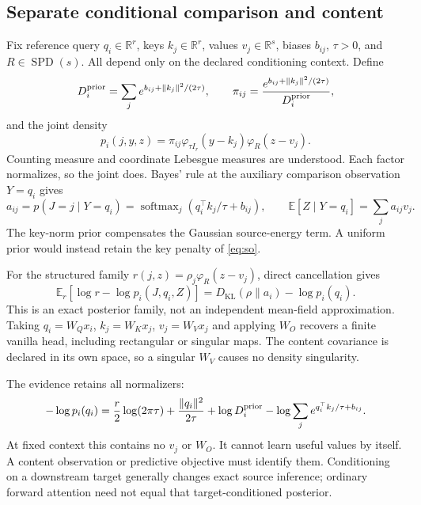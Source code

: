 \documentclass[11pt,letterpaper]{article}
\newcommand{\R}{\mathbb R}
\newcommand{\KL}{D_{\mathrm{KL}}}
\newcommand{\SPD}{\operatorname{SPD}}
\newcommand{\softmax}{\operatorname{softmax}}
\newcommand{\E}{\mathbb E}
\theoremstyle{remark}
\begin{document}
\subsection{Separate conditional comparison and content}
Fix reference query $q_i\in\R^r$, keys $k_j\in\R^r$, values $v_j\in\R^s$, biases $b_{ij}$, $\tau>0$, and $R\in\SPD(s)$. All depend only on the declared conditioning context. Define
\begin{equation}
 D_i^{\rm prior}=\sum_j e^{b_{ij}+\|k_j\|^2/(2\tau)},\qquad
 \pi_{ij}=\frac{e^{b_{ij}+\|k_j\|^2/(2\tau)}}{D_i^{\rm prior}},
\end{equation}
and the joint density
\begin{equation}
 p_i(j,y,z)=\pi_{ij}\varphi_{\tau I_r}(y-k_j)\varphi_R(z-v_j).
 \label{eq:joint}
\end{equation}
Counting measure and coordinate Lebesgue measures are understood. Each factor normalizes, so the joint does. Bayes' rule at the auxiliary comparison observation $Y=q_i$ gives
\begin{equation}
 a_{ij}=p(J=j\mid Y=q_i)=
 \softmax_j(q_i^\top k_j/\tau+b_{ij}),\qquad
 \E[Z\mid Y=q_i]=\sum_j a_{ij}v_j.
 \label{eq:predictive}
\end{equation}
The key-norm prior compensates the Gaussian source-energy term. A uniform prior would instead retain the key penalty of \eqref{eq:so}.

For the structured family $r(j,z)=\rho_j\varphi_R(z-v_j)$, direct cancellation gives
\begin{equation}
 \E_r[\log r-\log p_i(J,q_i,Z)]
 =\KL(\rho\|a_i)-\log p_i(q_i).
 \label{eq:structured}
\end{equation}
This is an exact posterior family, not an independent mean-field approximation. Taking $q_i=W_Qx_i$, $k_j=W_Kx_j$, $v_j=W_Vx_j$ and applying $W_O$ recovers a finite vanilla head, including rectangular or singular maps. The content covariance is declared in its own space, so a singular $W_V$ causes no density singularity.

The evidence retains all normalizers:
\begin{equation}
 -\log p_i(q_i)=\frac r2\log(2\pi\tau)+\frac{\|q_i\|^2}{2\tau}
 +\log D_i^{\rm prior}
 -\log\sum_j e^{q_i^\top k_j/\tau+b_{ij}}.
\end{equation}
At fixed context this contains no $v_j$ or $W_O$. It cannot learn useful values by itself. A content observation or predictive objective must identify them. Conditioning on a downstream target generally changes exact source inference; ordinary forward attention need not equal that target-conditioned posterior.
\end{document}
